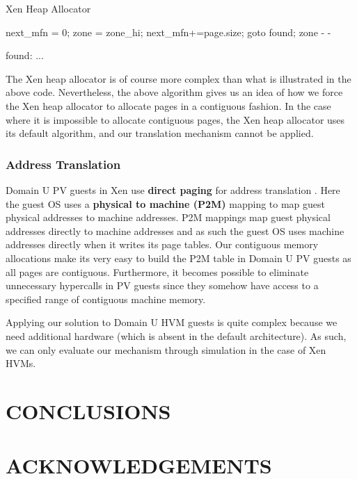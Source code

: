 \documentclass[sigconf]{sigplanconf}
\begin{document}
  \newpage
  \begin{algorithm}  
  	\caption{Xen Heap Allocator} 
  	\label{cont_aware}
  	\begin{algorithmic}[5]  
  		\Statex  
  		\State next\_mfn = 0;
  		\State zone = zone\_hi;
  		\State next\_mfn+=page.size;
  		\State goto found;
  		\EndIf
  		\EndFor
  		\EndIf  
  		\EndFor
  		\State zone - -
  		\EndWhile
  		
  		\State found: ...
  		\EndFunction  
  	\end{algorithmic}  
  \end{algorithm}
  
  The Xen heap allocator is of course more complex than what is illustrated in the above code. Nevertheless, the above algorithm gives us an idea of how we force the Xen heap allocator to allocate pages in a contiguous fashion. In the case where it is impossible to allocate contiguous pages, the Xen heap allocator uses its default algorithm, and our translation mechanism cannot be applied. 
  
  \subsubsection{Address Translation}
  Domain U PV guests in Xen use \textbf{direct paging} for address translation \cite{xenorg}. Here the guest OS uses a \textbf{physical to machine (P2M)} mapping to map guest physical addresses to machine addresses. P2M mappings map guest physical addresses directly to machine addresses and as such the guest OS uses machine addresses directly when it writes its page tables. Our contiguous memory allocations make its very easy to build the P2M table in Domain U PV guests as all pages are contiguous. Furthermore, it becomes possible to eliminate unnecessary hypercalls in PV guests since they somehow have access to a specified range of contiguous machine memory.
  
  Applying our solution to Domain U HVM guests is quite complex because we need additional hardware (which is absent in the default architecture). As such, we can only evaluate our mechanism through simulation in the case of Xen HVMs. 
      
         
 \section{CONCLUSIONS}
 \lipsum[3]
 \section{ACKNOWLEDGEMENTS}
 \lipsum[3]
\printbibliography
\end{document}
